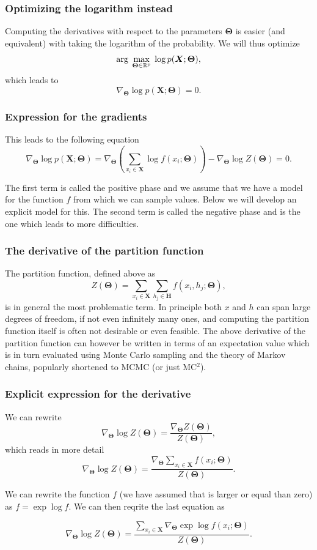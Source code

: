 \documentclass{beamer}
\begin{document}
\begin{frame}
\frametitle{Optimizing the logarithm instead}

Computing the derivatives with respect to the parameters $\bm{\Theta}$ is
easier (and equivalent) with taking the logarithm of the
probability. We will thus optimize
\[
{\displaystyle \mathrm{arg} \hspace{0.1cm}\max_{\bm{\bm{\Theta}}\in {\mathbb{R}}^{p}}} \hspace{0.1cm}\log{p(\bm{X};\bm{\Theta})},
\]
which leads to
\[
\nabla_{\bm{\Theta}}\log{p(\bm{X};\bm{\Theta})}=0.
\]
\end{frame}

\begin{frame}
\frametitle{Expression for the gradients}

This leads to the following equation
\[
\nabla_{\bm{\Theta}}\log{p(\bm{X};\bm{\Theta})}=\nabla_{\bm{\Theta}}\left(\sum_{x_i\in \bm{X}}\log{f(x_i;\bm{\Theta})}\right)-\nabla_{\bm{\Theta}}\log{Z(\bm{\Theta})}=0.
\]

The first term is called the positive phase and we assume that we have a model for the function $f$ from which we can sample values. Below we will develop an explicit model for this.
The second term is called the negative phase and is the one which leads to more difficulties.
\end{frame}

\begin{frame}
\frametitle{The derivative of the partition function}

The partition function, defined above as
\[
Z(\bm{\Theta})=\sum_{x_i\in \bm{X}}\sum_{h_j\in \bm{H}} f(x_i,h_j;\bm{\Theta}),
\]
is in general the most problematic term. In principle both $x$ and $h$ can span large degrees of freedom, if not even infinitely many ones, and computing the partition function itself is often not desirable or even feasible. The above derivative of the partition function can however be written in terms of an expectation value which is in turn evaluated  using Monte Carlo sampling and the theory of Markov chains, popularly shortened to MCMC (or just MC$^2$).
\end{frame}

\begin{frame}
\frametitle{Explicit expression for the derivative}

We can rewrite
\[
\nabla_{\bm{\Theta}}\log{Z(\bm{\Theta})}=\frac{\nabla_{\bm{\Theta}}Z(\bm{\Theta})}{Z(\bm{\Theta})},
\]
which reads in more detail
\[
\nabla_{\bm{\Theta}}\log{Z(\bm{\Theta})}=\frac{\nabla_{\bm{\Theta}} \sum_{x_i\in \bm{X}}f(x_i;\bm{\Theta})   }{Z(\bm{\Theta})}.
\]

We can rewrite the function $f$ (we have assumed that is larger or
equal than zero) as $f=\exp{\log{f}}$. We can then reqrite the last
equation as

\[
\nabla_{\bm{\Theta}}\log{Z(\bm{\Theta})}=\frac{ \sum_{x_i\in \bm{X}} \nabla_{\bm{\Theta}}\exp{\log{f(x_i;\bm{\Theta})}}   }{Z(\bm{\Theta})}.
\]
\end{frame}
\end{document}

